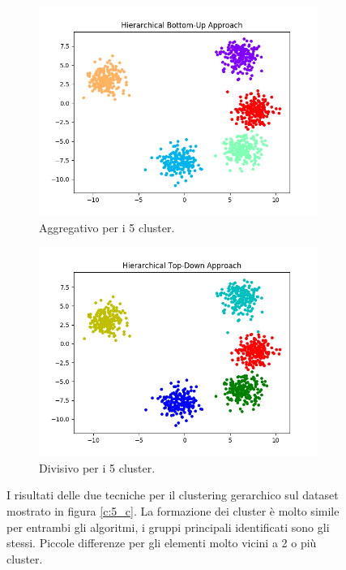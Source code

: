 \documentclass{llncs}
\begin{document}
	\begin{figure}[h]
		\centering
		\begin{subfigure}{.45\textwidth}
		  \centering
		  \includegraphics[width=\linewidth]{immagini/5_clusters_agg.png}
		  \caption{Aggregativo per i 5 cluster.}
		  \label{hier_normal:a}
		\end{subfigure}%
		\begin{subfigure}{.45\textwidth}
		  \centering
		  \includegraphics[width=\linewidth]{immagini/5_clusters_div.png}
		  \caption{Divisivo per i 5 cluster.}
		  \label{hier_normal:b}
		\end{subfigure}
		\caption{I risultati delle due tecniche per il clustering gerarchico sul dataset mostrato in figura \ref{c:5_c}.
		La formazione dei cluster è molto simile per entrambi gli algoritmi, i gruppi principali identificati sono gli stessi.
		Piccole differenze per gli elementi molto vicini a 2 o più cluster.}
		\label{hier_normal:test}
	\end{figure}
\end{document}
